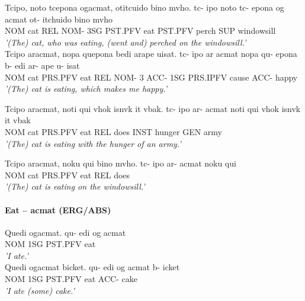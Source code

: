 \documentclass[11pt]{article}
\begin{document}
\begin{exe}
\ex \label{ex:relative} 
\begin{xlist}
  \ex \label{ex:relative:noto}
  Tcipo, noto tcepona ogacmat, otitcuido bino mvho.
  \gll
  tc- ipo noto tc-  epona og      acmat ot-     itchuido bino mvho\\
  NOM cat REL  NOM- 3SG   PST.PFV eat   PST.PFV perch    SUP  windowsill \\
  \trans
    \textit{'(The) cat, who was eating, (went and) perched on the windowsill.'}\\
  
  \ex \label{ex:relative:nopa}
  Tcipo aracmat, nopa quepona bedi arape uisat.
  \gll
  tc- ipo ar      acmat nopa qu-  epona b-    edi ar-      ape   u-    isat\\
  NOM cat PRS.PFV eat   REL  NOM- 3     ACC- 1SG PRS.IPFV cause ACC- happy\\
  \trans 
      \textit{'(The) cat is eating, which makes me happy.'}\\

  \begin{minipage}{\linewidth}
  \ex \label{ex:relative:noti}
  Tcipo aracmat, noti qui vhok isnvk it vbak.
  \gll
  tc- ipo ar-     acmat noti qui  vhok isnvk  it  vbak\\
  NOM cat PRS.PFV eat   REL  does INST hunger GEN army\\
  \trans
      \textit{'(The) cat is eating with the hunger of an army.'}\\
  \end{minipage}

  \begin{minipage}{\linewidth}
  \ex \label{ex:relative:noku}
  Tcipo aracmat, noku qui bino mvho.
  \gll
  tc- ipo ar-     acmat noku qui  \\
  NOM cat PRS.PFV eat   REL  does \\
  \trans
      \textit{'(The) cat is eating on the windowsill.'}\\
  \end{minipage}
\end{xlist}
\end{exe}


\paragraph{Eat – acmat (ERG/ABS)}
\begin{exe}
\ex \label{eat:S}
\begin{xlist}
\ex \label{fall:invol}
Quedi ogacmat.
\gll
qu-  edi og      acmat\\
NOM  1SG PST.PFV eat\\
\trans 
    \textit{'I ate.'}\\

\ex \label{eat:AN}
Quedi ogacmat bicket.
\gll
qu-  edi og      acmat b-   icket\\
NOM  1SG PST.PFV eat   ACC- cake\\
\trans 
    \textit{'I ate (some) cake.'}\\
\end{xlist}
\end{exe}
\end{document}
